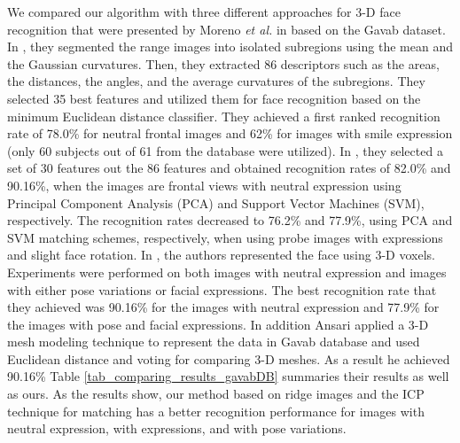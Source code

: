 We compared our algorithm with three different approaches for 3-D
face recognition that were presented by Moreno \textit{et al.} in
\cite{Moreno03, Moreno05_1, Moreno05_2} based on the Gavab dataset.
In \cite{Moreno03}, they segmented the range images into isolated
subregions using the mean and the Gaussian curvatures. Then, they
extracted 86 descriptors such as the areas, the distances, the
angles, and the average curvatures of the subregions. They selected
35 best features and utilized them for face recognition based on the
minimum Euclidean distance classifier. They achieved a first ranked
recognition rate of 78.0\% for neutral frontal images and 62\% for
images with smile expression (only 60 subjects out of 61 from the
database were utilized). In \cite{Moreno05_1}, they selected a set
of 30 features out the 86 features and obtained recognition rates of
82.0\% and 90.16\%, when the images are frontal views with neutral
expression using Principal Component Analysis (PCA) and Support
Vector Machines (SVM), respectively. The recognition rates decreased
to 76.2\% and 77.9\%, using PCA and SVM matching schemes,
respectively, when using probe images with expressions and slight
face rotation. In \cite{Moreno05_2}, the authors represented the
face using 3-D voxels. Experiments were performed on both images
with neutral expression and images with either pose variations or
facial expressions. The best recognition rate that they achieved was
90.16\% for the images with neutral expression and 77.9\% for the
images with pose and facial expressions. In addition Ansari
\cite{Nasser07_thesis} applied a 3-D mesh modeling technique to
represent the data in Gavab database and used Euclidean distance and
voting for comparing 3-D meshes. As a result he achieved 90.16\%
Table \ref{tab_comparing_results_gavabDB} summaries their results as
well as ours. As the results show, our method based on ridge images
and the ICP technique for matching has a better recognition
performance for images with neutral expression, with expressions,
and with pose variations.
